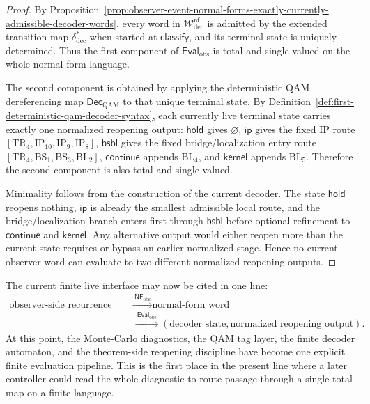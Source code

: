 \begin{proof}
By Proposition~\ref{prop:observer-event-normal-forms-exactly-currently-admissible-decoder-words}, every word in \(\mathcal W^{\mathrm{nf}}_{\mathrm{dec}}\) is admitted by the extended transition map \(\delta^{\ast}_{\mathrm{dec}}\) when started at \(\mathsf{classify}\), and its terminal state is uniquely determined. Thus the first component of \(\mathsf{Eval}_{\mathrm{obs}}\) is total and single-valued on the whole normal-form language.

The second component is obtained by applying the deterministic QAM dereferencing map \(\mathsf{Dec}_{\mathrm{QAM}}\) to that unique terminal state. By Definition~\ref{def:first-deterministic-qam-decoder-syntax}, each currently live terminal state carries exactly one normalized reopening output: \(\mathsf{hold}\) gives \(\varnothing\), \(\mathsf{ip}\) gives the fixed IP route \([\mathrm{TR}_4,\mathrm{IP}_{10},\mathrm{IP}_9,\mathrm{IP}_8]\), \(\mathsf{bsbl}\) gives the fixed bridge/localization entry route \([\mathrm{TR}_4,\mathrm{BS}_1,\mathrm{BS}_3,\mathrm{BL}_2]\), \(\mathsf{continue}\) appends \(\mathrm{BL}_4\), and \(\mathsf{kernel}\) appends \(\mathrm{BL}_5\). Therefore the second component is also total and single-valued.

Minimality follows from the construction of the current decoder. The state \(\mathsf{hold}\) reopens nothing, \(\mathsf{ip}\) is already the smallest admissible local route, and the bridge/localization branch enters first through \(\mathsf{bsbl}\) before optional refinement to \(\mathsf{continue}\) and \(\mathsf{kernel}\). Any alternative output would either reopen more than the current state requires or bypass an earlier normalized stage. Hence no current observer word can evaluate to two different normalized reopening outputs.
\end{proof}

\begin{remark}
\label{rem:immediate-operational-reading-eval-obs}
The current finite live interface may now be cited in one line:
\[
\begin{aligned}
\text{observer-side recurrence class}
&\xrightarrow{\ \mathsf{NF}_{\mathrm{obs}}\ }
\text{normal-form word}\\
&\xrightarrow{\ \mathsf{Eval}_{\mathrm{obs}}\ }
(\text{decoder state},\text{normalized reopening output}).
\end{aligned}
\]
At this point, the Monte-Carlo diagnostics, the QAM tag layer, the finite decoder automaton, and the theorem-side reopening discipline have become one explicit finite evaluation pipeline. This is the first place in the present line where a later controller could read the whole diagnostic-to-route passage through a single total map on a finite language.
\end{remark}



